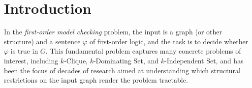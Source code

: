 \documentclass[11pt]{article}
\theoremstyle{definition}
\newcommand{\CC}{{\mathscr C}}
\begin{document}
\begin{abstract}
    
\end{abstract}




\setcounter{page}{1}

\section{Introduction}\label{sec:intro}

In the \emph{first-order model checking} problem, the input 
is a graph (or other structure) and a sentence $\varphi$ of first-order logic, and the task is to decide whether \(\varphi\) is true in \(G\).
This fundamental problem captures many concrete problems of interest,
including $k$-Clique, $k$-Dominating Set, and $k$-Independent Set, and
has been the focus of decades of research aimed at understanding which structural restrictions on the input graph render the problem tractable. 
\end{document}
